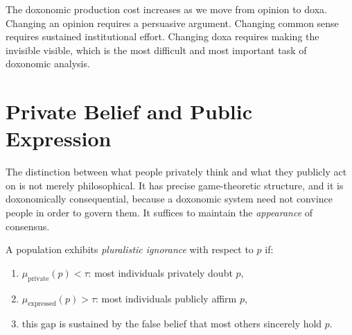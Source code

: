 The doxonomic production cost increases as we move from opinion to doxa.
Changing an opinion requires a persuasive argument.
Changing common sense requires sustained institutional effort.
Changing doxa requires making the invisible visible, which is the most difficult and most important task of doxonomic analysis.

\begin{center}
\end{center}


\section{Private Belief and Public Expression}
\label{sec:ch2-private-public}

The distinction between what people privately think and what they publicly act on is not merely philosophical.
It has precise game-theoretic structure, and it is doxonomically consequential, because a doxonomic system need not convince people in order to govern them.
It suffices to maintain the \emph{appearance} of consensus.

\begin{definition}
\label{def:pluralistic-ignorance}
A population exhibits \emph{pluralistic ignorance} with respect to $p$ if:
\begin{enumerate}[nosep]
  \item $\mu_{\text{private}}(p) < \tau$: most individuals privately doubt $p$,
  \item $\mu_{\text{expressed}}(p) > \tau$: most individuals publicly affirm $p$,
  \item this gap is sustained by the false belief that most others sincerely hold $p$.
\end{enumerate}
\end{definition}

